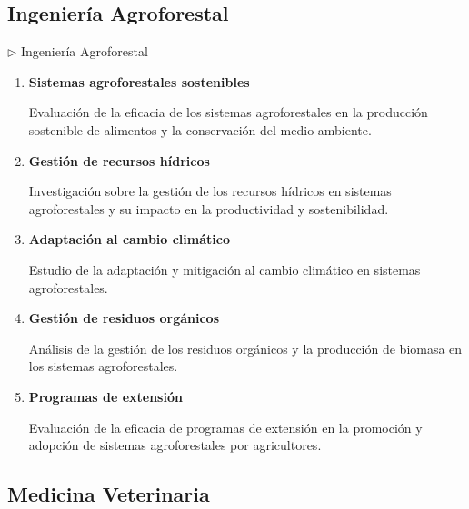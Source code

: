 \documentclass[12pt,a4paper]{article}
\begin{document}
\subsection{Ingeniería Agroforestal}

\begin{careerbox}{$\triangleright$ Ingeniería Agroforestal}
	\begin{enumerate}
		\item \textbf{Sistemas agroforestales sostenibles}
		
		Evaluación de la eficacia de los sistemas agroforestales en la producción sostenible de alimentos y la conservación del medio ambiente.
		
		\item \textbf{Gestión de recursos hídricos}
		
		Investigación sobre la gestión de los recursos hídricos en sistemas agroforestales y su impacto en la productividad y sostenibilidad.
		
		\item \textbf{Adaptación al cambio climático}
		
		Estudio de la adaptación y mitigación al cambio climático en sistemas agroforestales.
		
		\item \textbf{Gestión de residuos orgánicos}
		
		Análisis de la gestión de los residuos orgánicos y la producción de biomasa en los sistemas agroforestales.
		
		\item \textbf{Programas de extensión}
		
		Evaluación de la eficacia de programas de extensión en la promoción y adopción de sistemas agroforestales por agricultores.
	\end{enumerate}
\end{careerbox}

\subsection{Medicina Veterinaria}
\end{document}
